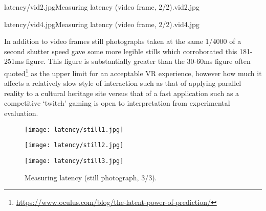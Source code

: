        {latency/vid2.jpg}{Measuring latency (video frame, 2/2).}{vid2.jpg}

       {latency/vid4.jpg}{Measuring latency (video frame, 2/2).}{vid4.jpg}

In addition to video frames still photographs taken at the same 1/4000 of a second shutter speed gave some more legible stills which corroborated this 181-251ms figure. This figure is substantially greater than the 30-60ms figure often quoted\footnote{\url{https://www.oculus.com/blog/the-latent-power-of-prediction/}} as the upper limit for an acceptable VR experience, however how much it affects a relatively slow style of interaction such as that of applying parallel reality to a cultural heritage site versus that of a fast application such as a competitive `twitch' gaming is open to interpretation from experimental evaluation.

\begin{figure}[h]
    \begin{center}
    \begin{minipage}{.32\textwidth}
        \begin{center}
        \texttt{[image: latency/still1.jpg]}
        \caption{Measuring latency (still photograph, 1/3).}
        \label{still1.jpg}
        \end{center}
    \end{minipage}%
    \hspace{.01\textwidth}
    \begin{minipage}{.32\textwidth}
		\begin{center}
        \texttt{[image: latency/still2.jpg]}
        \caption{Measuring latency (still photograph, 2/3).}
        \label{still2.jpg}
        \end{center}
    \end{minipage}%
    \hspace{.01\textwidth}
    \begin{minipage}{.32\textwidth}
        \begin{center}
        \texttt{[image: latency/still3.jpg]}
        \caption{Measuring latency (still photograph, 3/3).}
        \label{still3.jpg}
        \end{center}
    \end{minipage}
    \end{center}
\end{figure}


